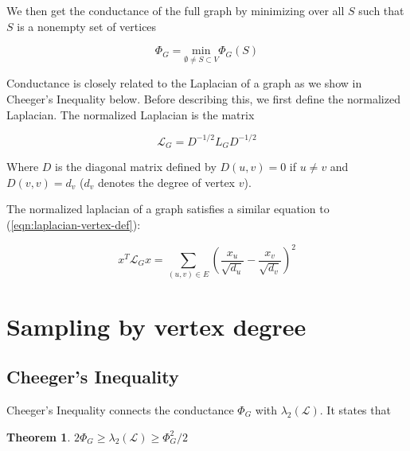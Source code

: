 \documentclass[12pt,twoside]{article}
\newtheorem{thm}{Theorem}
\begin{document}
We then get the conductance of the full graph by minimizing over all $S$ such that $S$ is a nonempty set of vertices

\begin{equation}
\Phi_G = \underset{\emptyset \not= S \subset V}{\text{min}} \Phi_G(S)
\end{equation}

Conductance is closely related to the Laplacian of a graph as we show in Cheeger's Inequality below. Before describing this, we first define the normalized Laplacian. The normalized Laplacian is the matrix

\begin{equation}
\mathcal{L}_G = D^{-1/2}L_GD^{-1/2}
\end{equation}

Where $D$ is the diagonal matrix defined by $D(u,v) = 0$ if $u \neq v$ and $D(v,v) = d_v$ ($d_v$ denotes the degree of vertex $v$). 

The normalized laplacian of a graph satisfies a similar equation to (\ref{eqn:laplacian-vertex-def}):

\begin{equation}
\label{eqn:norm-laplac}
x^T \mathcal{L}_G x = \sum_{(u,v) \in E} (\frac{x_u}{\sqrt{d_u}}-\frac{x_v}{\sqrt{d_v}})^2
\end{equation}

\section{Sampling by vertex degree}

\subsection{Cheeger's Inequality} %
Cheeger's Inequality connects the conductance $\Phi_G$ with $\lambda_2(\mathcal{L})$. It states that

\begin{thm}
$2\Phi_G \geq \lambda_2(\mathcal{L}) \geq \Phi_G^2/2$
\end{thm}
\end{document}
